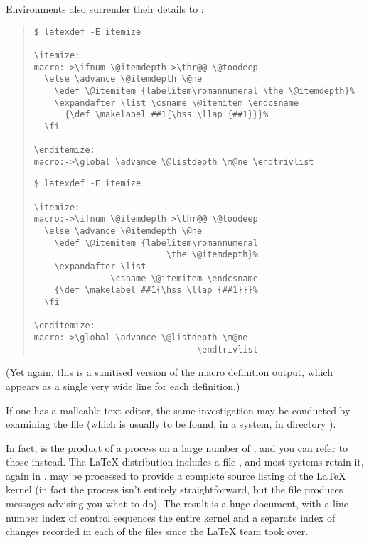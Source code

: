 Environments also surrender their details to :
\begin{quote}
\begin{wideversion}
\begin{verbatim}
$ latexdef -E itemize

\itemize:
macro:->\ifnum \@itemdepth >\thr@@ \@toodeep 
  \else \advance \@itemdepth \@ne
    \edef \@itemitem {labelitem\romannumeral \the \@itemdepth}%
    \expandafter \list \csname \@itemitem \endcsname
      {\def \makelabel ##1{\hss \llap {##1}}}%
  \fi 

\enditemize:
macro:->\global \advance \@listdepth \m@ne \endtrivlist 
\end{verbatim}
\end{wideversion}
\begin{narrowversion}
\begin{verbatim}
$ latexdef -E itemize

\itemize:
macro:->\ifnum \@itemdepth >\thr@@ \@toodeep 
  \else \advance \@itemdepth \@ne
    \edef \@itemitem {labelitem\romannumeral
                          \the \@itemdepth}%
    \expandafter \list
               \csname \@itemitem \endcsname
    {\def \makelabel ##1{\hss \llap {##1}}}%
  \fi 

\enditemize:
macro:->\global \advance \@listdepth \m@ne
                                \endtrivlist 
\end{verbatim}
\end{narrowversion}
\end{quote}
(Yet again, this is a sanitised version of the macro definition
output, which appears as a single very wide line for each definition.)

If one has a malleable text editor, the same investigation may be
conducted by examining the file  (which is usually to
be found, in a  system, in directory ).

In fact,  is the product of a 
process on a large number of , and
you can refer to those instead.  The \LaTeX{} distribution includes a file
, and most systems retain it, again in
.   may be processed to
provide a complete source listing of the \LaTeX{} kernel (in fact the
process isn't entirely straightforward, but the file produces messages
advising you what to do).  The result is a huge document, with a
line-number index of control sequences the entire kernel and a
separate index of changes recorded in each of the files since the
\LaTeX{} team took over.

